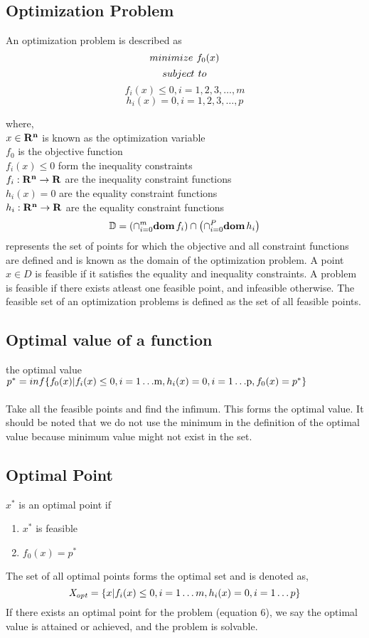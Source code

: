 \documentclass[twoside]{article}
\begin{document}
\subsection{Optimization Problem}
An optimization problem is described as
\[minimize \hspace*{0.05in}f_0(x)\]
\[subject \hspace*{0.05in} to\]
\[f_i(x) \leq 0, i = 1,2,3,\ldots,m\]
\[h_i(x) = 0, i = 1,2,3,\ldots,p\]
 \begin{text}
 where,\\
 \(x \in {\bf R^n}\) is known as the optimization variable\\
 $f_0$ is the objective function\\
 \(f_i(x) \leq 0\) form the inequality constraints\\
 \(f_i : {\bf R^n} \rightarrow {\bf R}\) are the inequality constraint functions\\
 \(h_i(x) = 0\) are the equality constraint functions\\
 \(h_i : {\bf R^n} \rightarrow {\bf R}\) are the equality constraint functions\\
 \[\mathbb{D} = \left(\cap_{i=0}^m {\bf dom }\hspace{0.5mm} f_i\right) \cap \left(\cap_{i=0}^P {\bf dom }\hspace{0.5mm} h_i\right)\]
 represents the set of points for which the objective and all constraint functions are defined and is known as the domain of the optimization problem. A point \(x \in D\) is feasible if it satisfies the equality and inequality
constraints. A problem is feasible if there exists atleast one feasible point, and infeasible otherwise. The feasible set of an optimization problems is defined as the set of all feasible points.
\end{text}
\subsection{Optimal value of a function}
\begin{text}
the optimal value \(p^* = inf \{f_0(x)|f_i(x) \leq 0,i = 1\ldots$m$, h_i(x) = 0, i = 1\ldots$p$, f_0(x) = p^* \}\)\\ \\
Take all the feasible points and find the infimum. This forms the optimal value. It should be noted that we do not use the minimum in the definition of the optimal value because minimum value might not exist in the set.
 \end{text}
\subsection{Optimal Point}
 $x^*$ is an optimal point if 
 \begin{enumerate}
 \item $x^*$ is feasible
 \item \(f_0(x) = p^*\)
 \end{enumerate}
 The set of all optimal points forms the optimal set and is denoted as,\\
 \[  {\bf \it X_{opt}} = \{x|f_i(x) \leq 0,i = 1\ldots{m}, h_i(x) = 0, i = 1\ldots{p} \} \]
 If there exists an optimal point for the problem (equation 6), we say the optimal value is attained or achieved, and the problem is solvable.
\end{document}
